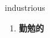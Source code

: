 
\begin{frame}
{\huge industrious}
\begin{center}
\begin{enumerate}\Large
  \item \textbf{勤勉的}
\end{enumerate}
\end{center}
\end{frame}
